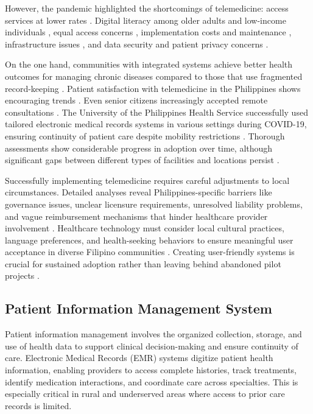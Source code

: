 \documentclass{research}
\begin{document}
However, the pandemic highlighted the shortcomings of telemedicine: access services at lower
rates \cite{Chu2021,Kichloo2020}. Digital literacy among older adults and low-income individuals
\cite{Abdul2024,Castillo2023}, equal access concerns \cite{Fairchild2019,DAmore2021,Anzalone2025},
implementation costs and maintenance \cite{Zachrison2021,Chen2020}, infrastructure issues
\cite{Chandrasekaran2021,Ngugi2021,Rhoades2025}, and data security and patient privacy concerns
\cite{Smith2021}.

On the one hand, communities with integrated systems achieve better health outcomes for managing
chronic diseases compared to those that use fragmented record-keeping \cite{Mendoza2023}. Patient
satisfaction with telemedicine in the Philippines shows encouraging trends \cite{Mendoza2023,Salazar2021}.
Even senior citizens increasingly accepted remote consultations \cite{Aquino2022}. The University
of the Philippines Health Service successfully used tailored electronic medical records systems in
various settings during COVID-19, ensuring continuity of patient care despite mobility restrictions
\cite{PhilPrimaryStudies2024,Pickering2024}. Thorough assessments show considerable progress in
adoption over time, although significant gaps between different types of facilities and locations
persist \cite{AdlerMilstein2023,Rhoades2025}.

Successfully implementing telemedicine requires careful adjustments to local circumstances.
Detailed analyses reveal Philippines-specific barriers like governance issues, unclear licensure
requirements, unresolved liability problems, and vague reimbursement mechanisms that hinder
healthcare provider involvement \cite{Macariola2021,Domingo2023}. Healthcare technology must
consider local cultural practices, language preferences, and health-seeking behaviors to ensure
meaningful user acceptance in diverse Filipino communities \cite{Cruz2022}. Creating user-friendly
systems is crucial for sustained adoption rather than leaving behind abandoned pilot projects
\cite{Tiu2022}.

\subsection*{Patient Information Management System}

Patient information management involves the organized collection, storage, and use of health data
to support clinical decision-making and ensure continuity of care. Electronic Medical Records (EMR)
systems digitize patient health information, enabling providers to access complete histories, track
treatments, identify medication interactions, and coordinate care across specialties. This is
especially critical in rural and underserved areas where access to prior care records is limited.
\end{document}
